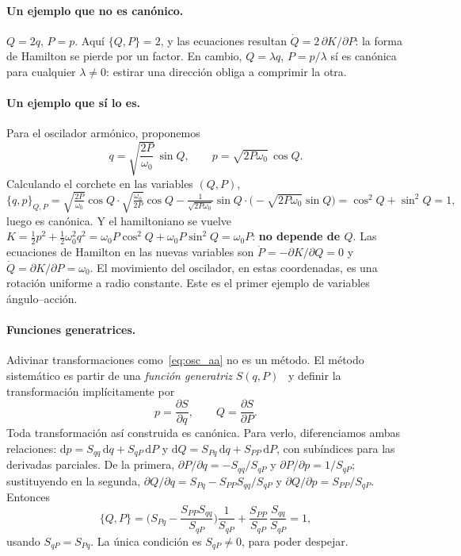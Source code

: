 \documentclass[11pt,a4paper]{article}
\newcommand{\dd}{\mathrm{d}}
\theoremstyle{definition}
\begin{document}
\paragraph{Un ejemplo que no es canónico.} $Q=2q$, $P=p$. Aquí $\{Q,P\}=2$, y las
ecuaciones resultan $\dot Q=2\,\partial K/\partial P$: la forma de Hamilton se pierde
por un factor. En cambio, $Q=\lambda q$, $P=p/\lambda$ sí es canónica para cualquier
$\lambda\neq0$: estirar una dirección obliga a comprimir la otra.

\paragraph{Un ejemplo que sí lo es.} Para el oscilador armónico, proponemos
\begin{equation}
  q=\sqrt{\frac{2P}{\omega_0}}\,\sin Q, \qquad p=\sqrt{2P\omega_0}\,\cos Q .
  \label{eq:osc_aa}
\end{equation}
Calculando el corchete en las variables $(Q,P)$,
\begin{equation}
  \{q,p\}_{Q,P}
  = \sqrt{\tfrac{2P}{\omega_0}}\cos Q\cdot\sqrt{\tfrac{\omega_0}{2P}}\cos Q
   -\tfrac{1}{\sqrt{2P\omega_0}}\sin Q\cdot\big(-\sqrt{2P\omega_0}\sin Q\big)
  = \cos^2Q+\sin^2Q = 1 ,
\end{equation}
luego es canónica. Y el hamiltoniano se vuelve
$K=\tfrac12p^2+\tfrac12\omega_0^2q^2=\omega_0P\cos^2Q+\omega_0P\sin^2Q=\omega_0P$:
\textbf{no depende de $Q$}. Las ecuaciones de Hamilton en las nuevas variables son
$\dot P=-\partial K/\partial Q=0$ y $\dot Q=\partial K/\partial P=\omega_0$. El
movimiento del oscilador, en estas coordenadas, es una rotación uniforme a radio
constante. Este es el primer ejemplo de variables ángulo--acción.

\paragraph{Funciones generatrices.} Adivinar transformaciones como~\eqref{eq:osc_aa}
no es un método. El método sistemático es partir de una \emph{función generatriz}
$S(q,P)$~\cite[\S9.1]{goldstein2002} y definir la transformación implícitamente por
\begin{equation}
  p = \frac{\partial S}{\partial q}, \qquad Q = \frac{\partial S}{\partial P} .
  \label{eq:generatriz}
\end{equation}
Toda transformación así construida es canónica. Para verlo, diferenciamos ambas
relaciones: $\dd p=S_{qq}\,\dd q+S_{qP}\,\dd P$ y $\dd Q=S_{Pq}\,\dd q+S_{PP}\,\dd P$,
con subíndices para las derivadas parciales. De la primera,
$\partial P/\partial q=-S_{qq}/S_{qP}$ y $\partial P/\partial p=1/S_{qP}$;
sustituyendo en la segunda, $\partial Q/\partial q=S_{Pq}-S_{PP}S_{qq}/S_{qP}$ y
$\partial Q/\partial p=S_{PP}/S_{qP}$. Entonces
\begin{equation}
  \{Q,P\}
  = \Big(S_{Pq}-\frac{S_{PP}S_{qq}}{S_{qP}}\Big)\frac{1}{S_{qP}}
   +\frac{S_{PP}}{S_{qP}}\,\frac{S_{qq}}{S_{qP}}
  = 1 ,
\end{equation}
usando $S_{qP}=S_{Pq}$. La única condición es $S_{qP}\neq0$, para poder despejar.
\end{document}
